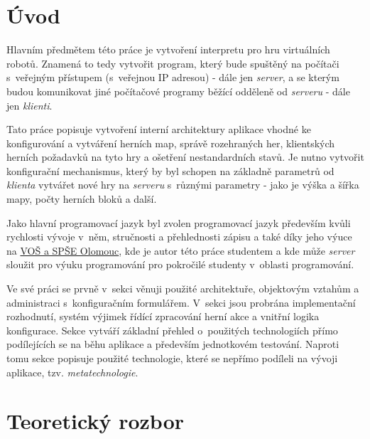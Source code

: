 \section*{Úvod}
{\large\sloppy

Hlavním předmětem této práce je vytvoření interpretu pro hru virtuálních robotů. Znamená to tedy vytvořit program, který bude spuštěný na počítači s~veřejným přístupem (s~veřejnou IP adresou) - dále jen \emph{server}, a se kterým budou komunikovat jiné počítačové programy běžící odděleně od \emph{serveru} - dále jen \emph{klienti}.

Tato práce popisuje vytvoření interní architektury aplikace vhodné ke konfigurování a vytváření herních map, správě rozehraných her, klientských herních požadavků na tyto hry a ošetření nestandardních stavů. Je nutno vytvořit konfigurační mechanismus, který by byl schopen na základně parametrů od \emph{klienta} vytvářet nové hry na \emph{serveru} s~různými parametry - jako je výška a šířka mapy, počty herních bloků a další. 

Jako hlavní programovací jazyk byl zvolen programovací jazyk  především kvůli rychlosti vývoje v~něm, stručnosti a přehlednosti zápisu a také díky jeho výuce na \href{http://www.spseol.cz/}{VOŠ a SPŠE Olomouc}, kde je autor této práce studentem a kde může \emph{server} sloužit pro výuku programování pro pokročilé studenty v~oblasti programování.  

Ve své práci se prvně v~sekci  věnuji použité architektuře, objektovým vztahům a administraci s~konfiguračním formulářem. V~sekci  jsou probrána implementační rozhodnutí, systém výjimek řídící zpracování herní akce a vnitřní logika konfigurace. Sekce  vytváří základní přehled o~použitých technologiích přímo podílejících se na běhu aplikace a především jednotkovém testování. Naproti tomu sekce  popisuje použité technologie, které se nepřímo podíleli na vývoji aplikace, tzv. \emph{metatechnologie}.

}

\section{Teoretický rozbor}
\label{sec:theory-analyse}

